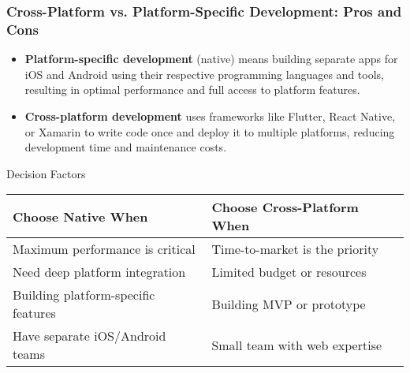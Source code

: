 \documentclass{beamer}
\begin{document}
	\begin{frame}
		\frametitle{Cross-Platform vs. Platform-Specific Development: Pros and Cons}
		
		\begin{itemize}
			\item \textbf{Platform-specific development} (native) means building separate apps for iOS and Android using their respective programming languages and tools, resulting in optimal performance and full access to platform features.
			\item \textbf{Cross-platform development} uses frameworks like Flutter, React Native, or Xamarin to write code once and deploy it to multiple platforms, reducing development time and maintenance costs.

		\end{itemize}
		
		\begin{alertblock}{\scriptsize{Decision Factors}}
			\scriptsize{
				\begin{tabular}{|p{4.5cm}|p{4.5cm}|}
					\hline
					\textbf{Choose Native When} & \textbf{Choose Cross-Platform When} \\
					\hline
					Maximum performance is critical & Time-to-market is the priority \\
					\hline
					Need deep platform integration & Limited budget or resources \\
					\hline
					Building platform-specific features & Building MVP or prototype \\
					\hline
					Have separate iOS/Android teams & Small team with web expertise \\
					\hline
				\end{tabular}
			}
		\end{alertblock}
		
	\end{frame}
	
\end{document}
